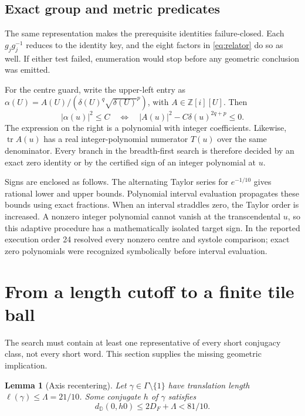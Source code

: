 \documentclass[11pt,a4paper]{article}
\newtheorem{lemma}[theorem]{Lemma}
\theoremstyle{definition}
\newcommand{\D}{\mathbb D}
\newcommand{\Z}{\mathbb Z}
\newcommand{\tr}{\operatorname{tr}}
\newcommand{\length}{\ell}
\begin{document}
\subsection{Exact group and metric predicates}

The same representation makes the prerequisite identities failure-closed.
Each \(g_jg_j^{-1}\) reduces to the identity key, and the eight factors in
\eqref{eq:relator} do so as well.  If either test failed, enumeration would
stop before any geometric conclusion was emitted.

For the centre guard, write the upper-left entry as
\(\alpha(U)=A(U)/(\delta(U)^q\sqrt{\delta(U)}^p)\), with
\(A\in\Z[i][U]\).  Then
\begin{equation}\label{eq:center-poly}
 |\alpha(u)|^2\leq C
 \quad\Longleftrightarrow\quad
 |A(u)|^2-C\delta(u)^{2q+p}\leq0.
\end{equation}
The expression on the right is a polynomial with integer coefficients.
Likewise, \(\tr A(u)\) has a real integer-polynomial numerator \(T(u)\) over
the same denominator.  Every branch in the breadth-first search is therefore
decided by an exact zero identity or by the certified sign of an integer
polynomial at \(u\).

Signs are enclosed as follows.  The alternating Taylor series for
\(e^{-1/10}\) gives rational lower and upper bounds.  Polynomial interval
evaluation propagates these bounds using exact fractions.  When an interval
straddles zero, the Taylor order is increased.  A nonzero integer polynomial
cannot vanish at the transcendental \(u\), so this adaptive procedure has a
mathematically isolated target sign.  In the reported execution order 24
resolved every nonzero centre and systole comparison; exact zero polynomials
were recognized symbolically before interval evaluation.

\section{From a length cutoff to a finite tile ball}
\label{sec:completeness}

The search must contain at least one representative of every short
conjugacy class, not every short word.  This section supplies the missing
geometric implication.

\begin{lemma}[Axis recentering]\label{lem:recenter}
Let \(\gamma\in\Gamma\setminus\{1\}\) have translation length
\(\length(\gamma)\leq\Lambda=21/10\).  Some conjugate \(h\) of \(\gamma\)
satisfies
\[
 d_{\D}(0,h0)\leq2D_F+\Lambda<81/10.
\]
\end{lemma}
\end{document}

